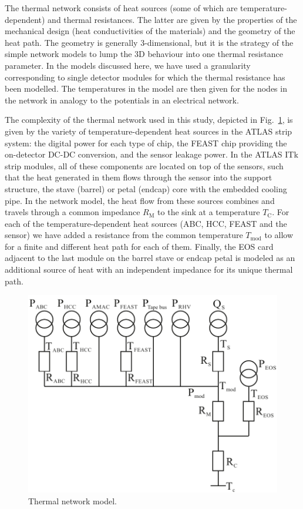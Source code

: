 The thermal network consists of heat sources (some of which are temperature-dependent) and thermal resistances. The latter are given by the properties of the mechanical design (heat conductivities of the materials) and the geometry of the heat path. The geometry is generally 3-dimensional, but it is the strategy of the simple network models to lump the 3D behaviour into one thermal resistance parameter. In the models discussed here, we have used a granularity corresponding to single detector modules for which the thermal resistance has been modelled. The temperatures in the model are then given for the nodes in the network in analogy to the potentials in an electrical network.

The complexity of the thermal network used in this study, depicted in Fig.~\ref{fig:thermalmodel}, is given by the variety of temperature-dependent heat sources in the ATLAS strip system: the digital power for each type of chip, the FEAST chip providing the on-detector DC-DC conversion, and the sensor leakage power. In the ATLAS ITk strip modules, all of these components are located on top of the sensors, such that the heat generated in them flows through the sensor into the support structure, the stave (barrel) or petal (endcap) core with the embedded cooling pipe. In the network model, the heat flow from these sources combines and travels through a common impedance $R_\text{M}$ to the sink at a temperature $T_\text{C}$. For each of the temperature-dependent heat sources (ABC, HCC, FEAST and the sensor) we have added a resistance from the common temperature $T_\text{mod}$ to allow for a finite and different heat path for each of them. Finally, the EOS card adjacent to the last module on the barrel stave or endcap petal is modeled as an additional source of heat with an independent impedance for its unique thermal path.

\begin{figure}[ht]
\centering
\includegraphics[width=0.6\linewidth]{figures/Thermalmodel.pdf}
\caption{Thermal network model.}
\label{fig:thermalmodel}
\end{figure}

